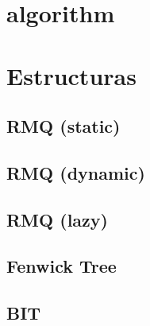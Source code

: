 

\def\title{El Bueno, el Ralo y el Feo - FCEyN, Universidad de Buenos Aires}
 
\section{algorithm}%


\section{Estructuras}%
\subsection{RMQ (static)}
\subsection{RMQ (dynamic)}
\subsection{RMQ (lazy)}
\subsection{Fenwick Tree} %
\subsection{BIT} %
